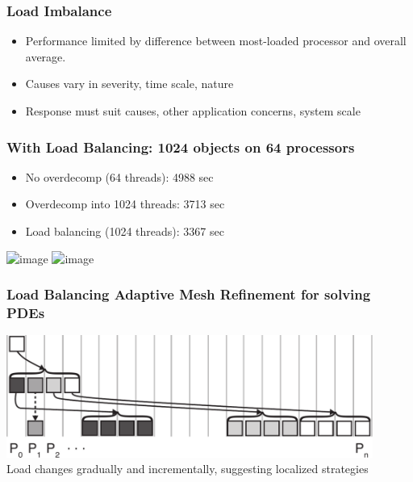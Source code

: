 


\begin{frame}
\frametitle{Load Imbalance}
\begin{itemize}
\item Performance limited by difference between most-loaded processor and overall average.\\
\pause
\item Causes vary in severity, time scale, nature
\pause
\item Response must suit causes, other application concerns, system scale
\end{itemize}
\end{frame}


\begin{frame}[fragile]
\frametitle{With Load Balancing: 1024 objects on 64 processors}
\begin{center}
\begin{itemize}
\item No overdecomp (64 threads): 4988 sec
\item Overdecomp into 1024 threads: 3713 sec
\item<2-> Load balancing (1024 threads): 3367 sec
\end{itemize}
\includegraphics<1>[width=0.9\textwidth]{../figures/usageVirtual.png}
\includegraphics<2>[width=0.8\textwidth]{../figures/usageLB.png}
\end{center}
\end{frame}


\begin{frame}
\frametitle{Load Balancing Adaptive Mesh Refinement for solving PDEs}
\includegraphics[width=0.9\textwidth]{../figures/amr_mapping.pdf}\\
Load changes gradually and incrementally, suggesting localized strategies
\end{frame}


